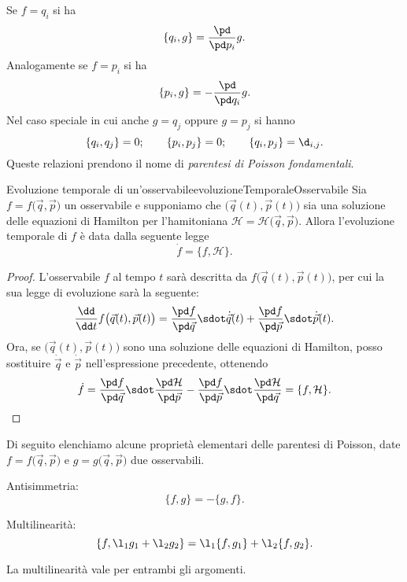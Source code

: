 \begin{ese}
	Se \(f=q_i\) si ha
	\[
		\{q_i,g\} = \frac{\pd}{\pd p_i} g.
	\]
	Analogamente se \(f=p_i\) si ha
	\[
		\{p_i,g\} = -\frac{\pd}{\pd q_i} g.
	\]
	Nel caso speciale in cui anche \(g=q_j\) oppure \(g=p_j\) si hanno
	\[
		\{q_i,q_j\} = 0; \qquad \{p_i,p_j\} = 0; \qquad \{q_i,p_j\} = \d_{i,j}.
	\]
	Queste relazioni prendono il nome di \emph{parentesi di Poisson fondamentali}.
\end{ese}

\begin{prop}{Evoluzione temporale di un'osservabile}{evoluzioneTemporaleOsservabile}
	Sia \(f=f\big(\vec{q},\vec{p}\big)\) un osservabile e supponiamo che \(\big(\vec{q}(t),\vec{p}(t)\big)\) sia una soluzione delle equazioni di Hamilton per l'hamitoniana \(\mathcal{H}=\mathcal{H}\big(\vec{q},\vec{p}\big)\). Allora l'evoluzione temporale di \(f\) è data dalla seguente legge
	\[
		\dot{f} = \{f,\mathcal{H}\}.
	\]
\end{prop}

\begin{proof}
	L'osservabile \(f\) al tempo \(t\) sarà descritta da \(f\big(\vec{q}(t),\vec{p}(t)\big)\), per cui la sua legge di evoluzione sarà la seguente:
	\[
		\frac{\dd}{\dd t}f\big(\vec{q}(t),\vec{p}(t)\big) = \frac{\pd f}{\pd\vec{q}}\sdot\dot{\vec{q}}(t) + \frac{\pd f}{\pd\vec{p}}\sdot \dot{\vec{p}}(t).
	\]
	Ora, se \(\big(\vec{q}(t),\vec{p}(t)\big)\) sono una soluzione delle equazioni di Hamilton, posso sostituire \(\dot{\vec{q}}\) e \(\dot{\vec{p}}\) nell'espressione precedente, ottenendo
	\[
		\dot{f} = \frac{\pd f}{\pd\vec{q}} \sdot \frac{\pd\mathcal{H}}{\pd\vec{p}} - \frac{\pd f}{\pd\vec{p}} \sdot \frac{\pd\mathcal{H}}{\pd\vec{q}} = \{f,\mathcal{H}\}.\qedhere
	\]
\end{proof}
\noindent
Di seguito elenchiamo alcune proprietà elementari delle parentesi di Poisson, date \(f=f\big(\vec{q},\vec{p}\big)\) e \(g=g\big(\vec{q},\vec{p}\big)\) due osservabili.

\begin{pr}
	Antisimmetria:
	\[
		\{f,g\} = -\{g,f\}.
	\]
\end{pr}

\begin{pr}
	Multilinearità:
	\[
		\{f,\l_1 g_1 + \l_2 g_2\} = \l_1\{f,g_1\} + \l_2 \{f,g_2\}.
	\]
\end{pr}

\begin{oss}
	La multilinearità vale per entrambi gli argomenti.
\end{oss}


